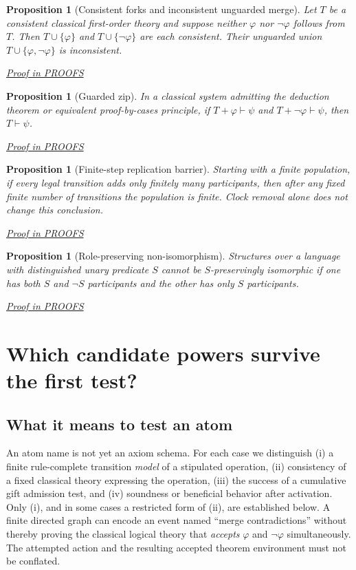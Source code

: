 \documentclass[11pt,letterpaper]{article}
\newtheorem{proposition}[theorem]{Proposition}
\theoremstyle{definition}\newtheorem{definition}[theorem]{Definition}\newtheorem{example}[theorem]{Example}
\theoremstyle{remark}\newtheorem{remark}[theorem]{Remark}
\newcommand{\proofat}[1]{\par\smallskip\noindent\hfill\textit{\hyperref[#1]{Proof in PROOFS}}}
\begin{document}
\begin{proposition}[Consistent forks and inconsistent unguarded merge]\label{w0:prop:fork}
Let $T$ be a consistent classical first-order theory and suppose neither $\varphi$ nor $\neg\varphi$ follows from $T$. Then $T\cup\{\varphi\}$ and $T\cup\{\neg\varphi\}$ are each consistent. Their unguarded union $T\cup\{\varphi,\neg\varphi\}$ is inconsistent.\proofat{w0:pr:fork}
\end{proposition}
\begin{proposition}[Guarded zip]\label{w0:prop:zip}
In a classical system admitting the deduction theorem or equivalent proof-by-cases principle, if $T+\varphi\vdash\psi$ and $T+\neg\varphi\vdash\psi$, then $T\vdash\psi$.\proofat{w0:pr:zip}
\end{proposition}
\begin{proposition}[Finite-step replication barrier]\label{w0:prop:finitude}
Starting with a finite population, if every legal transition adds only finitely many participants, then after any fixed finite number of transitions the population is finite. Clock removal alone does not change this conclusion.\proofat{w0:pr:finitude}
\end{proposition}
\begin{proposition}[Role-preserving non-isomorphism]\label{w0:prop:role}
Structures over a language with distinguished unary predicate $S$ cannot be $S$-preservingly isomorphic if one has both $S$ and $\neg S$ participants and the other has only $S$ participants.\proofat{w0:pr:role}
\end{proposition}


\section{Which candidate powers survive the first test?}\label{sec:first-atom-audit}\label{w0:sec:atom-audit}
\subsection{What it means to test an atom}
An atom name is not yet an axiom schema. For each case we distinguish (i) a finite rule-complete transition \emph{model} of a stipulated operation, (ii) consistency of a fixed classical theory expressing the operation, (iii) the success of a cumulative gift admission test, and (iv) soundness or beneficial behavior after activation. Only (i), and in some cases a restricted form of (ii), are established below. A finite directed graph can encode an event named ``merge contradictions'' without thereby proving the classical logical theory that \emph{accepts} $\varphi$ and $\neg\varphi$ simultaneously. The attempted action and the resulting accepted theorem environment must not be conflated.
\end{document}
